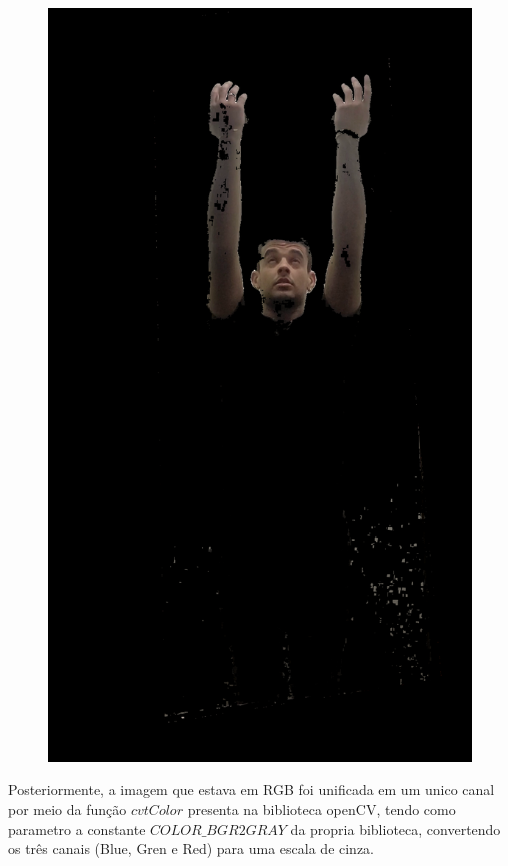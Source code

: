 \begin{figure}[H]
\begin{minipage}{\sizeImg\textwidth}
            \includegraphics[width=\textwidth]{figuras/mao_barra/skin.png}
        \end{minipage}
    \label{fig:skin}
\end{figure}

Posteriormente, a imagem que estava em \ac{RGB} foi unificada em um unico canal por meio da função $cvtColor$ presenta na biblioteca \ac{openCV}, tendo como parametro a constante $COLOR\_BGR2GRAY$ da propria biblioteca, convertendo os três canais (Blue, Gren e Red) para uma escala de cinza.

